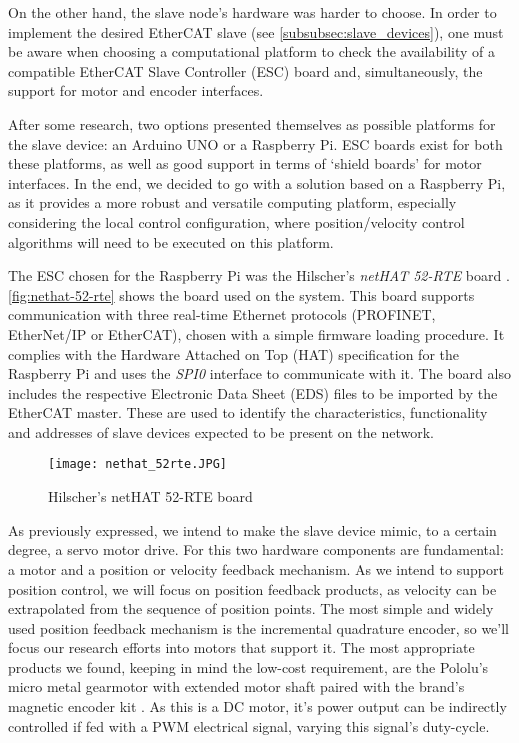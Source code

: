 On the other hand, the slave node's hardware was harder to choose.
In order to implement the desired EtherCAT slave (see \autoref{subsubsec:slave_devices}), one must be aware when choosing a computational platform to check the availability of a compatible EtherCAT Slave Controller (ESC) board and, simultaneously, the support for motor and encoder interfaces.

After some research, two options presented themselves as possible platforms for the slave device: an Arduino UNO or a Raspberry Pi.
ESC boards exist for both these platforms, as well as good support in terms of `shield boards' for motor interfaces.
In the end, we decided to go with a solution based on a Raspberry Pi, as it provides a more robust and versatile computing platform, especially considering the local control configuration, where position/velocity control algorithms will need to be executed on this platform.

The ESC chosen for the Raspberry Pi was the Hilscher's \emph{netHAT 52-RTE} board \cite{hdw:nethat-52rte}.
\autoref{fig:nethat-52-rte} shows the board used on the system.
This board supports communication with three real-time Ethernet protocols (PROFINET, EtherNet/IP or EtherCAT), chosen with a simple firmware loading procedure.
It complies with the Hardware Attached on Top (HAT) specification for the Raspberry Pi \cite{technology:hats} and uses the \emph{SPI0} interface to communicate with it.
The board also includes the respective Electronic Data Sheet (EDS) files to be imported by the EtherCAT master.
These are used to identify the characteristics, functionality and addresses of slave devices expected to be present on the network.

\begin{figure}[htp]
	\centering
	\texttt{[image: nethat\_52rte.JPG]}
	\caption{Hilscher's netHAT 52-RTE board}
	\label{fig:nethat-52-rte}
\end{figure}

As previously expressed, we intend to make the slave device mimic, to a certain degree, a servo motor drive.
For this two hardware components are fundamental: a motor and a position or velocity feedback mechanism.
As we intend to support position control, we will focus on position feedback products, as velocity can be extrapolated from the sequence of position points.
The most simple and widely used position feedback mechanism is the incremental quadrature encoder, so we'll focus our research efforts into motors that support it.
The most appropriate products we found, keeping in mind the low-cost requirement, are the Pololu's micro metal gearmotor with extended motor shaft \cite{product:pololu-micrometal-gearmotor} paired with the brand's magnetic encoder kit \cite{product:pololu-encoder-kit}.
As this is a DC motor, it's power output can be indirectly controlled if fed with a PWM electrical signal, varying this signal's duty-cycle. %

